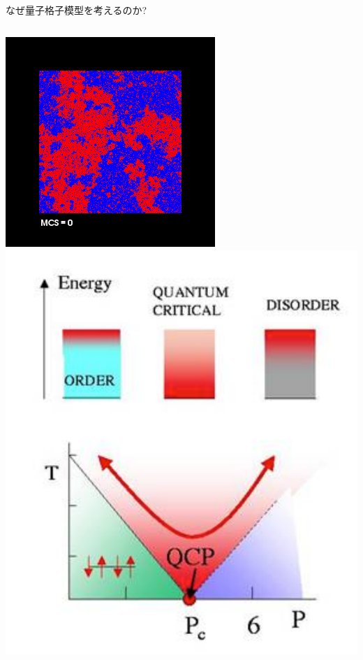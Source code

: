 \begin{frame}[t,fragile]{なぜ量子格子模型を考えるのか?}
  \begin{columns}[T]
    \begin{column}{.2\textwidth}
      \includegraphics[width=\textwidth]{ising-tc.png} \\
      \includegraphics[width=\textwidth]{qcp.pdf}

\end{column}
\end{columns}
\end{frame}
